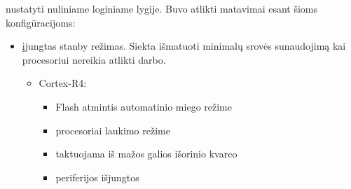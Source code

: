 \documentclass[a4paper, 12pt]{article} %
\begin{document}
\begin{onehalfspacing}
  nustatyti nuliniame loginiame lygije. Buvo atlikti matavimai
  esant \v{s}ioms konfig\={u}racijoms:
\begin{itemize}
\item \k{i}jungtas stanby re\v{z}imas. Siekta i\v{s}matuoti minimal\k{u} srov\.{e}s sunaudojim\k{a} kai procesoriui nereikia atlikti darbo. 
\begin{itemize} 
\item Cortex-R4:
\begin{itemize}
\item Flash atmintis automatinio miego re\v{z}ime
\item procesoriai laukimo re\v{z}ime
\item taktuojama i\v{s} ma\v{z}os galios i\v{s}orinio kvarco 
\item periferijos i\v{s}jungtos
\end{itemize}


\end{itemize}
\end{itemize}
\end{onehalfspacing}
\end{document}
